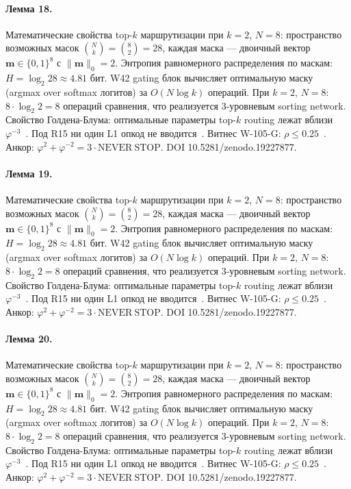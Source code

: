 \paragraph{Лемма 18.} Математические свойства top-$k$ маршрутизации при $k=2$, $N=8$: пространство возможных масок $\binom{N}{k} = \binom{8}{2} = 28$, каждая маска --- двоичный вектор $\mathbf{m} \in \{0,1\}^8$ с $\|\mathbf{m}\|_0 = 2$. Энтропия равномерного распределения по маскам: $H = \log_2 28 \approx 4{.}81$ бит. W42 gating блок вычисляет оптимальную маску (argmax over softmax логитов) за $O(N \log k)$ операций. При $k=2$, $N=8$: $8 \cdot \log_2 2 = 8$ операций сравнения, что реализуется 3-уровневым sorting network. Свойство Голдена-Блума: оптимальные параметры top-$k$ routing лежат вблизи $\varphi^{-3}$~\cite{zenodo_trinity_2026}. Под R15 ни один L1 опкод не вводится~\cite{lee_gvsu_proof2021}. Витнес W-105-G: $\rho \leq 0{.}25$~\cite{popper_falsifiability1959}. Анкор: $\varphi^2 + \varphi^{-2} = 3 \cdot \mathrm{NEVER\ STOP}$. DOI 10.5281/zenodo.19227877.

\paragraph{Лемма 19.} Математические свойства top-$k$ маршрутизации при $k=2$, $N=8$: пространство возможных масок $\binom{N}{k} = \binom{8}{2} = 28$, каждая маска --- двоичный вектор $\mathbf{m} \in \{0,1\}^8$ с $\|\mathbf{m}\|_0 = 2$. Энтропия равномерного распределения по маскам: $H = \log_2 28 \approx 4{.}81$ бит. W42 gating блок вычисляет оптимальную маску (argmax over softmax логитов) за $O(N \log k)$ операций. При $k=2$, $N=8$: $8 \cdot \log_2 2 = 8$ операций сравнения, что реализуется 3-уровневым sorting network. Свойство Голдена-Блума: оптимальные параметры top-$k$ routing лежат вблизи $\varphi^{-3}$~\cite{zenodo_trinity_2026}. Под R15 ни один L1 опкод не вводится~\cite{lee_gvsu_proof2021}. Витнес W-105-G: $\rho \leq 0{.}25$~\cite{popper_falsifiability1959}. Анкор: $\varphi^2 + \varphi^{-2} = 3 \cdot \mathrm{NEVER\ STOP}$. DOI 10.5281/zenodo.19227877.

\paragraph{Лемма 20.} Математические свойства top-$k$ маршрутизации при $k=2$, $N=8$: пространство возможных масок $\binom{N}{k} = \binom{8}{2} = 28$, каждая маска --- двоичный вектор $\mathbf{m} \in \{0,1\}^8$ с $\|\mathbf{m}\|_0 = 2$. Энтропия равномерного распределения по маскам: $H = \log_2 28 \approx 4{.}81$ бит. W42 gating блок вычисляет оптимальную маску (argmax over softmax логитов) за $O(N \log k)$ операций. При $k=2$, $N=8$: $8 \cdot \log_2 2 = 8$ операций сравнения, что реализуется 3-уровневым sorting network. Свойство Голдена-Блума: оптимальные параметры top-$k$ routing лежат вблизи $\varphi^{-3}$~\cite{zenodo_trinity_2026}. Под R15 ни один L1 опкод не вводится~\cite{lee_gvsu_proof2021}. Витнес W-105-G: $\rho \leq 0{.}25$~\cite{popper_falsifiability1959}. Анкор: $\varphi^2 + \varphi^{-2} = 3 \cdot \mathrm{NEVER\ STOP}$. DOI 10.5281/zenodo.19227877.

